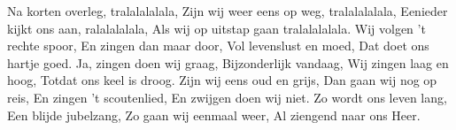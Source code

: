 \beginverse*
Na korten overleg, tralalalalala,
Zijn wij weer eens op weg, tralalalalala,
Eenieder kijkt ons aan, ralalalalala,
Als wij op uitstap gaan tralalalalala.
\endverse
\beginverse*
Wij volgen 't rechte spoor,
En zingen dan maar door,
Vol levenslust en moed,
Dat doet ons hartje goed.
\endverse
\beginverse*
Ja, zingen doen wij graag,
Bijzonderlijk vandaag,
Wij zingen laag en hoog,
Totdat ons keel is droog.
\endverse
\beginverse*
Zijn wij eens oud en grijs,
Dan gaan wij nog op reis,
En zingen 't scoutenlied,
En zwijgen doen wij niet.
\endverse
\beginverse*
Zo wordt ons leven lang,
Een blijde jubelzang,
Zo gaan wij eenmaal weer,
Al ziengend naar ons Heer.
\endverse
\endsong
